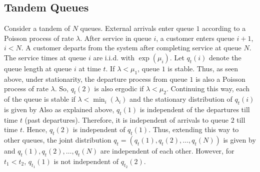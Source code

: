 \documentclass[all-lectures.tex]{subfiles}
\begin{document}
\subsection{Tandem Queues}
Consider a tandem of $N$ queues. External arrivals enter queue $1$ according to a Poisson process of rate $\lambda$. After service in queue $i$, a customer enters queue $i+1$, $i<N$. A customer departs from the system after completing service at queue $N$. The service times at queue $i$ are i.i.d. with $\exp(\mu_i)$. Let $q_t(i)$ denote the queue length at queue $i$ at time $t$. If $\lambda < \mu_1$, queue $1$ is stable. Thus, as seen above, under stationarity, the departure process from queue $1$ is also a Poisson process of rate $\lambda$. So, $q_t(2)$ is also ergodic if $\lambda < \mu_2$. Continuing this way, each of the queue is stable if $\lambda < \min_i(\lambda_i)$ and the stationary distribution of $q_t(i)$ is given by
Also as explained above, $q_{t}(1)$ is independent of the departures till time $t$ (past departures). Therefore, it is independent of arrivals to queue $2$ till time $t$. Hence, $q_t(2)$ is independent of $q_t(1)$. Thus, extending this way to other queues, the joint distribution $q_t = (q_t(1), q_t(2), \dots , q_t(N))$ is given by
and $q_t(1), q_t(2), \dots , q_t(N)$ are independent of each other. However, for $t_1 < t_2$, $q_{t_1}(1)$ is not independent of $q_{t_2}(2)$.
\end{document}
